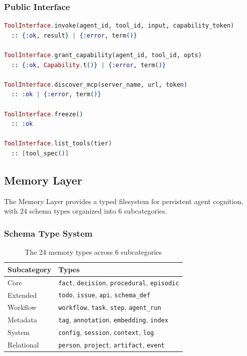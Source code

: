 \documentclass[12pt,a4paper]{article}
\theoremstyle{definition}
\begin{document}
\subsubsection{Public Interface}

\begin{lstlisting}[language=elixir, caption={Tool Interface public API}]
ToolInterface.invoke(agent_id, tool_id, input, capability_token)
  :: {:ok, result} | {:error, term()}

ToolInterface.grant_capability(agent_id, tool_id, opts)
  :: {:ok, Capability.t()} | {:error, term()}

ToolInterface.discover_mcp(server_name, url, token)
  :: :ok | {:error, term()}

ToolInterface.freeze()
  :: :ok

ToolInterface.list_tools(tier)
  :: [tool_spec()]
\end{lstlisting}

\subsection{Memory Layer}\label{subsec:memory}

The Memory Layer provides a typed filesystem for persistent agent cognition,
with 24 schema types organized into 6 subcategories.

\subsubsection{Schema Type System}

\begin{table}[H]
\centering
\caption{The 24 memory types across 6 subcategories}
\begin{tabular}{ll}
\toprule
\textbf{Subcategory} & \textbf{Types} \\
\midrule
Core       & \texttt{fact}, \texttt{decision}, \texttt{procedural}, \texttt{episodic} \\
Extended   & \texttt{todo}, \texttt{issue}, \texttt{api}, \texttt{schema\_def} \\
Workflow   & \texttt{workflow}, \texttt{task}, \texttt{step}, \texttt{agent\_run} \\
Metadata   & \texttt{tag}, \texttt{annotation}, \texttt{embedding}, \texttt{index} \\
System     & \texttt{config}, \texttt{session}, \texttt{context}, \texttt{log} \\
Relational & \texttt{person}, \texttt{project}, \texttt{artifact}, \texttt{event} \\
\bottomrule
\end{tabular}
\end{table}
\end{document}
